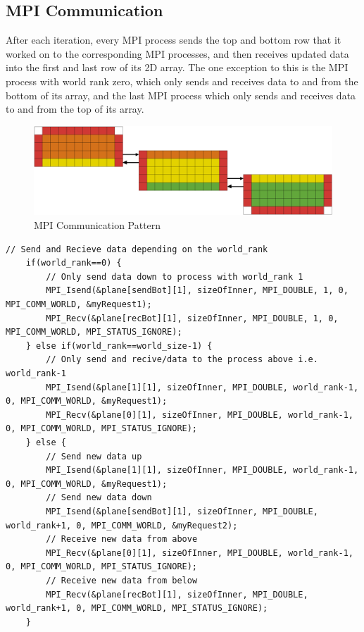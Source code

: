 \documentclass{report}
\begin{document}
\subsection{MPI Communication}
After each iteration, every MPI process sends the top and bottom row that it worked on to the corresponding MPI processes, and then receives updated data into the first and last row of its 2D array. The one exception to this is the MPI process with world rank zero, which only sends and receives data to and from the bottom of its array, and the last MPI process which only sends and receives data to and from the top of its array.

\newpage

\begin{figure}[h]
\includegraphics[width=1\linewidth]{mpi-com} 
\caption{MPI Communication Pattern}
\label{fig:subim2}
\end{figure}

\begin{lstlisting}[style=customc,caption=MPI Communication]
    // Send and Recieve data depending on the world_rank
    if(world_rank==0) {
        // Only send data down to process with world_rank 1
        MPI_Isend(&plane[sendBot][1], sizeOfInner, MPI_DOUBLE, 1, 0, MPI_COMM_WORLD, &myRequest1);
        MPI_Recv(&plane[recBot][1], sizeOfInner, MPI_DOUBLE, 1, 0, MPI_COMM_WORLD, MPI_STATUS_IGNORE);
    } else if(world_rank==world_size-1) {
        // Only send and recive/data to the process above i.e. world_rank-1
        MPI_Isend(&plane[1][1], sizeOfInner, MPI_DOUBLE, world_rank-1, 0, MPI_COMM_WORLD, &myRequest1);
        MPI_Recv(&plane[0][1], sizeOfInner, MPI_DOUBLE, world_rank-1, 0, MPI_COMM_WORLD, MPI_STATUS_IGNORE);
    } else {
        // Send new data up
        MPI_Isend(&plane[1][1], sizeOfInner, MPI_DOUBLE, world_rank-1, 0, MPI_COMM_WORLD, &myRequest1);
        // Send new data down 
        MPI_Isend(&plane[sendBot][1], sizeOfInner, MPI_DOUBLE, world_rank+1, 0, MPI_COMM_WORLD, &myRequest2);
        // Receive new data from above
        MPI_Recv(&plane[0][1], sizeOfInner, MPI_DOUBLE, world_rank-1, 0, MPI_COMM_WORLD, MPI_STATUS_IGNORE);
        // Receive new data from below
        MPI_Recv(&plane[recBot][1], sizeOfInner, MPI_DOUBLE, world_rank+1, 0, MPI_COMM_WORLD, MPI_STATUS_IGNORE);
    }
\end{lstlisting}
\end{document}
